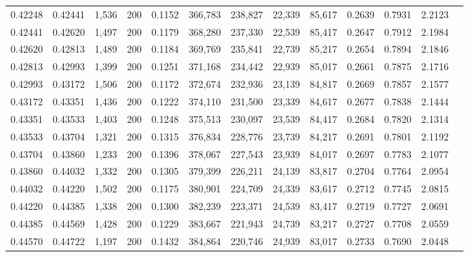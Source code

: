 \begin{tabular}{rrrrrrrrrrrrr}
0.42248 & 0.42441 &  1,536 & 200 &                                     0.1152 & 366,783 & 238,827 &  22,339 &  85,617 & 0.2639 & 0.7931 & 2.2123 \\
0.42441 & 0.42620 &  1,497 & 200 &                                     0.1179 & 368,280 & 237,330 &  22,539 &  85,417 & 0.2647 & 0.7912 & 2.1984 \\
0.42620 & 0.42813 &  1,489 & 200 &                                     0.1184 & 369,769 & 235,841 &  22,739 &  85,217 & 0.2654 & 0.7894 & 2.1846 \\
0.42813 & 0.42993 &  1,399 & 200 &                                     0.1251 & 371,168 & 234,442 &  22,939 &  85,017 & 0.2661 & 0.7875 & 2.1716 \\
0.42993 & 0.43172 &  1,506 & 200 &                                     0.1172 & 372,674 & 232,936 &  23,139 &  84,817 & 0.2669 & 0.7857 & 2.1577 \\
0.43172 & 0.43351 &  1,436 & 200 &                                     0.1222 & 374,110 & 231,500 &  23,339 &  84,617 & 0.2677 & 0.7838 & 2.1444 \\
0.43351 & 0.43533 &  1,403 & 200 &                                     0.1248 & 375,513 & 230,097 &  23,539 &  84,417 & 0.2684 & 0.7820 & 2.1314 \\
0.43533 & 0.43704 &  1,321 & 200 &                                     0.1315 & 376,834 & 228,776 &  23,739 &  84,217 & 0.2691 & 0.7801 & 2.1192 \\
0.43704 & 0.43860 &  1,233 & 200 &                                     0.1396 & 378,067 & 227,543 &  23,939 &  84,017 & 0.2697 & 0.7783 & 2.1077 \\
0.43860 & 0.44032 &  1,332 & 200 &                                     0.1305 & 379,399 & 226,211 &  24,139 &  83,817 & 0.2704 & 0.7764 & 2.0954 \\
0.44032 & 0.44220 &  1,502 & 200 &                                     0.1175 & 380,901 & 224,709 &  24,339 &  83,617 & 0.2712 & 0.7745 & 2.0815 \\
0.44220 & 0.44385 &  1,338 & 200 &                                     0.1300 & 382,239 & 223,371 &  24,539 &  83,417 & 0.2719 & 0.7727 & 2.0691 \\
0.44385 & 0.44569 &  1,428 & 200 &                                     0.1229 & 383,667 & 221,943 &  24,739 &  83,217 & 0.2727 & 0.7708 & 2.0559 \\
0.44570 & 0.44722 &  1,197 & 200 &                                     0.1432 & 384,864 & 220,746 &  24,939 &  83,017 & 0.2733 & 0.7690 & 2.0448 \\

\end{tabular}
